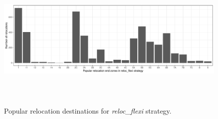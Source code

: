 \begin{figure}
	\label{fig:reloc_flexi_end_zones}
	\caption{Popular relocation destinations for \textit{reloc\_flexi} strategy.}
	\includegraphics[width=\textwidth,height=7cm]{figures/reloc_flexi_end_zones.pdf}
\end{figure}
